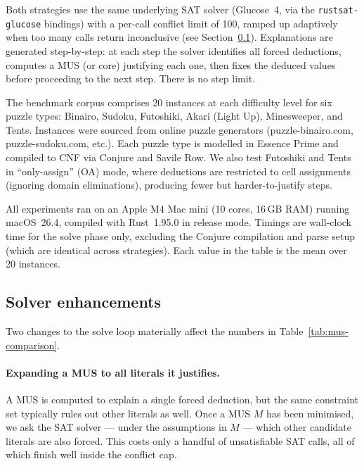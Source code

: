 Both strategies use the same underlying SAT solver (Glucose~4,
via the \texttt{rustsat-glucose} bindings) with a per-call conflict
limit of 100, ramped up adaptively when too many calls return
inconclusive (see Section~\ref{sec:enhancements}).  Explanations are
generated step-by-step: at each step the solver identifies all forced
deductions, computes a MUS (or core) justifying each one, then fixes
the deduced values before proceeding to the next step.  There is no
step limit.

The benchmark corpus comprises 20 instances at each difficulty level
for six puzzle types: Binairo, Sudoku, Futoshiki, Akari (Light Up),
Minesweeper, and Tents.  Instances were sourced from online puzzle
generators (puzzle-binairo.com, puzzle-sudoku.com, etc.).  Each puzzle
type is modelled in Essence Prime and compiled to CNF via Conjure and
Savile Row.  We also test Futoshiki and Tents in ``only-assign'' (OA)
mode, where deductions are restricted to cell assignments (ignoring
domain eliminations), producing fewer but harder-to-justify steps.

All experiments ran on an Apple M4 Mac mini (10 cores, 16\,GB RAM)
running macOS~26.4, compiled with Rust~1.95.0 in release mode.
Timings are wall-clock time for the solve phase only, excluding the
Conjure compilation and parse setup (which are identical across
strategies).  Each value in the table is the mean over 20 instances.



\subsection{Solver enhancements}
\label{sec:enhancements}

Two changes to the solve loop materially affect the numbers in
Table~\ref{tab:mus-comparison}.

\paragraph{Expanding a MUS to all literals it justifies.}

A MUS is computed to explain a single forced deduction, but the same
constraint set typically rules out other literals as well.  Once a MUS
$M$ has been minimised, we ask the SAT solver --- under the
assumptions in $M$ --- which other candidate literals are also forced.
This costs only a handful of unsatisfiable SAT calls, all of which
finish well inside the conflict cap.

